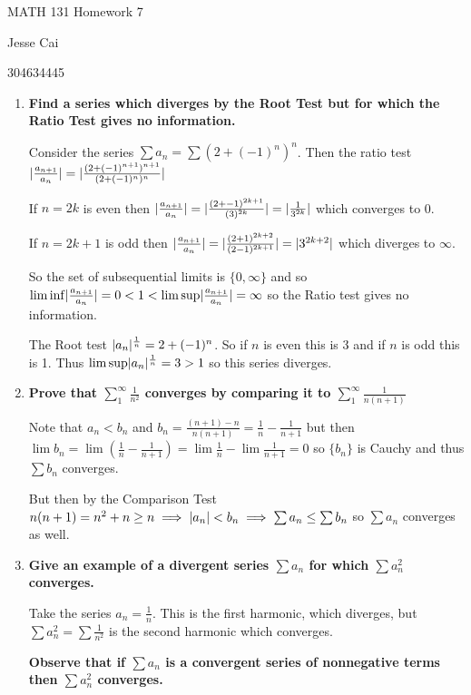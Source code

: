 \documentclass[10pt,a4paper]{article}
\DeclarePairedDelimiter{\abs}{\lvert}{\rvert}
\begin{document}
 
MATH 131 Homework 7

Jesse Cai

304634445

\begin{enumerate}
    \item \textbf{Find a series which diverges by the Root Test but for which the Ratio Test gives no information.}

        Consider the series $\sum a_n = \sum (2+ (-1)^n)^n$. Then the ratio test $\abs{\frac{a_{n+1}}{a_n}} = \abs{\frac{(2+ (-1)^{n+1})^{n+1}}{(2+ (-1)^{n})^{n}}}$

        If $n=2k$ is even then $\abs{\frac{a_{n+1}}{a_n}} = \abs{\frac{(2 + -1)^{2k+1}}{(3)^{2k}}} = \abs{\frac{1}{3^{2k}}}$ which converges to 0.

        If $n=2k+1$ is odd then $\abs{\frac{a_{n+1}}{a_n}} = \abs{\frac{(2 + 1)^{2k+2}}{(2-1)^{2k+1}}} = \abs{3^{2k+2}}$ which diverges to $\infty$.

        So the set of subsequential limits is $\{0, \infty \}$ and so $\liminf \abs{\frac{a_{n+1}}{a_n}} = 0 < 1 < \limsup \abs{\frac{a_{n+1}}{a_n}} = \infty$ so the Ratio test gives no information.

        The Root test $\abs{a_n}^{\frac{1}{n}} =  2 + (-1)^n$. So if $n$ is even this is 3 and if $n$ is odd this is 1.
        Thus $\limsup \abs{a_n}^{\frac{1}{n}} = 3 > 1$ so this series diverges.

    \item \textbf{ Prove that $\sum_1^\infty \frac{1}{n^2}$ converges by comparing it to $\sum_1^\infty \frac{1}{n(n+1)}$}

        Note that $a_n < b_n$ and $b_n = \frac{(n+1) - n }{n(n+1)} = \frac{1}{n} - \frac{1}{n+1}$ but then $\lim b_n = \lim (\frac{1}{n} - \frac{1}{n+1}) = \lim \frac{1}{n} - \lim \frac{1}{n+1} = 0$ so $\{ b_n \}$ is Cauchy and thus $\sum b_n$ converges.

        But then by the Comparison Test  $n(n+1) =  n^2 +n \geq n \implies \abs{a_n} < b_n \implies \sum a_n \leq \sum b_n$ so $\sum a_n$ converges as well.

            
    \item \textbf{Give an example of a divergent series $\sum a_n$ for which $\sum a_n^2$ converges.}

        Take the series $a_n = \frac{1}{n}$. This is the first harmonic, which diverges, but $\sum a_n^2 = \sum \frac{1}{n^2}$ is the second harmonic which converges.

        \textbf{Observe that if $\sum a_n$ is a convergent series of nonnegative terms then $\sum a_n^2$ converges.}


\end{enumerate}
\end{document}
